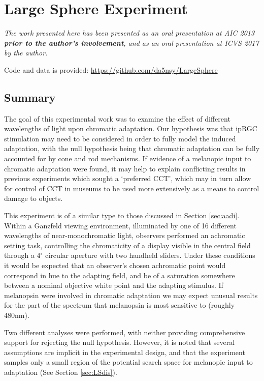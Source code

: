 \chapter{Large Sphere Experiment} %
\label{chap:LargeSphere}

\textit{The work presented here has been presented as an oral presentation at AIC 2013 \citep{macdonald_chromatic_2013} \textbf{prior to the author's involvement}, and as an oral presentation at ICVS 2017 \citep{garside_investigations_2017} by the author.}

Code and data is provided: \url{https://github.com/da5nsy/LargeSphere}

\section{Summary}

The goal of this experimental work was to examine the effect of different wavelengths of light upon chromatic adaptation. Our hypothesis was that \gls{ipRGC} stimulation may need to be considered in order to fully model the induced adaptation, with the null hypothesis being that chromatic adaptation can be fully accounted for by cone and rod mechanisms. If evidence of a melanopic input to chromatic adaptation were found, it may help to explain conflicting results in previous experiments which sought a `preferred \gls{CCT}', which may in turn allow for control of \gls{CCT} in museums to be used more extensively as a means to control damage to objects. 

This experiment is of a similar type to those discussed in Section \ref{sec:aadi}. Within a Ganzfeld viewing environment, illuminated by one of 16 different wavelengths of near-monochromatic light, observers performed an achromatic setting task, controlling the chromaticity of a display visible in the central field through a 4$^{\circ}$ circular aperture with two handheld sliders. Under these conditions it would be expected that an observer's chosen achromatic point would correspond in hue to the adapting field, and be of a saturation somewhere between a nominal objective white point and the adapting stimulus. If melanopsin were involved in chromatic adaptation we may expect unusual results for the part of the spectrum that melanopsin is most sensitive to (roughly 480nm).

Two different analyses were performed, with neither providing comprehensive support for rejecting the null hypothesis. However, it is noted that several assumptions are implicit in the experimental design, and that the experiment samples only a small region of the potential search space for melanopic input to adaptation (See Section \ref{sec:LSdis}).

